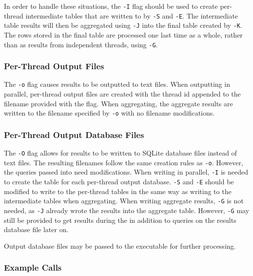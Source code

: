 In order to handle these situations, the \texttt{-I} flag should be
used to create per-thread intermediate tables that are written to by
\texttt{-S} and \texttt{-E}. The intermediate table results will then
be aggregated using \texttt{-J} into the final table created by
\texttt{-K}. The rows stored in the final table are processed one last
time as a whole, rather than as results from independent threads,
using \texttt{-G}.

\subsubsection{Per-Thread Output Files}
The \texttt{-o} flag causes results to be outputted to text
files. When outputting in parallel, per-thread output files are
created with the thread id appended to the filename provided with the
flag. When aggregating, the aggregate results are written to the
filename specified by \texttt{-o} with no filename modifications.

\subsubsection{Per-Thread Output Database Files}
The \texttt{-O} flag allows for results to be written to SQLite
database files instead of text files. The resulting filenames follow
the same creation rules as \texttt{-o}. However, the queries passed
into \gufiquery need modifications. When writing in parallel,
\texttt{-I} is needed to create the table for each per-thread output
database. \texttt{-S} and \texttt{-E} should be modified to write to
the per-thread tables in the same way as writing to the intermediate
tables when aggregating. When writing aggregate results, \texttt{-G}
is not needed, as \texttt{-J} already wrote the results into the
aggregate table. However, \texttt{-G} may still be provided to get
results during the \gufiquery in addition to queries on the results
database file later on.

Output database files may be passed to the \querydbs executable for
further processing.

\subsubsection{Example Calls}

